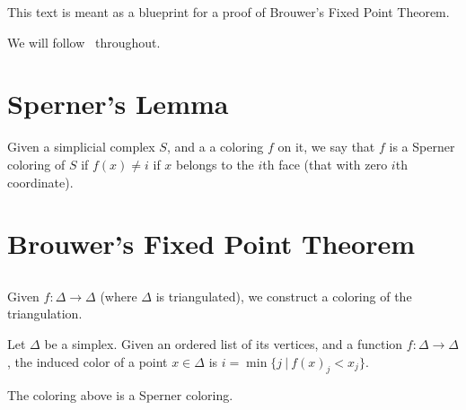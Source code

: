 \maketitle

\begin{remark}
  This text is meant as a blueprint for a proof of Brouwer's Fixed Point Theorem.
\end{remark}

We will follow~\cite{castellana2017} throughout.

\section{Sperner's Lemma}

\begin{definition}
\label{is_sperner_colouring}
\leanok
Given a simplicial complex $S$, and a a coloring $f$ on it, we say that $f$ is a Sperner coloring of $S$ if $f(x) \neq i$ if $x$ belongs to the $i$th face (that with zero $i$th coordinate).
\end{definition}


\begin{lemma}
  \label{sperner}
  \leanok
\end{lemma}

\section{Brouwer's Fixed Point Theorem}

\subsection{}
Given $f\colon \Delta \to \Delta$ (where $\Delta$ is triangulated), we construct a coloring of the triangulation.

\begin{definition}
\label{def:induced_colouring}
Let $\Delta$ be a simplex. Given an ordered list of its vertices, and a function $f:\Delta \to \Delta$, the induced color of a point $x\in \Delta$ is $i=\min\{j ~|~ f(x)_j < x_j\}$.
\end{definition}

\begin{lemma}
\label{induced_colouring_is_sperner_colouring}
The coloring above is a Sperner coloring.
\end{lemma}

